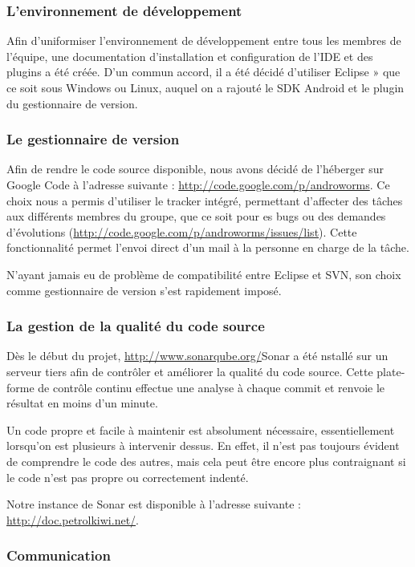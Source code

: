 \documentclass{report}
\begin{document}
\subsubsection{L'environnement de développement}
Afin d’uniformiser l’environnement de développement entre tous les
membres de l’équipe, une documentation d’installation et configuration
de l’IDE et des plugins a été créée.
D’un commun accord, il a été décidé d’utiliser Eclipse » que ce soit
sous Windows ou Linux, auquel on a rajouté le SDK Android et le plugin
du gestionnaire de version.

\subsubsection{Le gestionnaire de version}

Afin de rendre le code source disponible, nous avons décidé de
l’héberger sur Google Code à l’adresse suivante :
\url{http://code.google.com/p/androworms}.
Ce choix nous a permis d’utiliser le tracker intégré, permettant
d’affecter des tâches aux différents membres du groupe, que ce soit pour
es bugs ou des demandes d’évolutions
(\url{http://code.google.com/p/androworms/issues/list}). Cette
fonctionnalité permet l’envoi direct d’un mail à la personne en charge
de la tâche.

N’ayant jamais eu de problème de compatibilité entre Eclipse et SVN,
son choix comme gestionnaire de version s’est rapidement imposé.

\subsubsection{La gestion de la qualité du code source}

Dès le début du projet, \url{http://www.sonarqube.org/}{Sonar} a été
nstallé sur un serveur tiers afin de contrôler et améliorer la qualité
du code source.
Cette plate-forme de contrôle continu effectue une analyse à chaque
commit et renvoie le résultat en moins d’un minute.

Un code propre et facile à maintenir est absolument nécessaire,
essentiellement lorsqu’on est plusieurs à intervenir dessus. En effet,
il n’est pas toujours évident de comprendre le code des autres, mais
cela peut être encore plus contraignant si le code n’est pas propre ou
correctement indenté.

Notre instance de Sonar est disponible à l’adresse suivante :
\url{http://doc.petrolkiwi.net/}.

\subsubsection{Communication}
\end{document}
